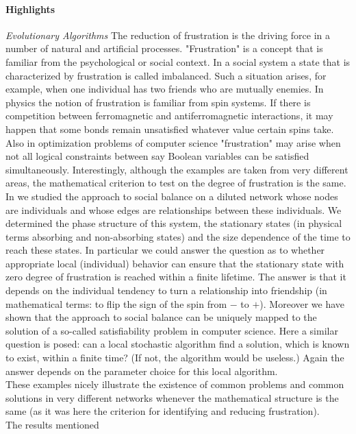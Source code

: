 \paragraph{Highlights}
{\it Evolutionary Algorithms}
The reduction of frustration is the driving force in a number of
natural and artificial processes. "Frustration" is a concept that
is familiar from the psychological or social context. In a social
system a state that is characterized by frustration is called
imbalanced. Such a situation arises, for example, when one
individual has two friends who are mutually enemies. In physics
the notion of frustration is familiar from spin systems. If there
is competition between ferromagnetic and antiferromagnetic
interactions, it may happen that some bonds remain unsatisfied
whatever value certain spins take. Also in optimization problems
of computer science "frustration" may arise when not all logical
constraints between say Boolean variables can be satisfied
simultaneously. Interestingly, although the examples are taken
from very different areas, the mathematical criterion to test on
the degree of frustration is the same. In \cite{ortmanns1} we
studied the approach to social balance on a diluted network whose
nodes are individuals and whose edges are relationships between
these individuals. We determined the phase structure of this
system, the stationary states (in physical terms absorbing and
non-absorbing states) and the size dependence of the time to reach
these states. In particular we could answer the question as to
whether appropriate local (individual) behavior can ensure that
the stationary state with zero degree of frustration is reached
within a finite lifetime. The answer is that it depends on the
individual tendency to turn a relationship into friendship (in
mathematical terms: to flip the sign of the spin from $-$ to $+$).
Moreover we have shown that the approach to social balance can be
uniquely mapped to the solution of a so-called satisfiability
problem in computer science. Here a similar question is posed: can
a local stochastic algorithm find a solution, which is known to
exist, within a finite time? (If not, the algorithm would be
useless.)
Again the answer depends on the parameter choice for this local algorithm. \\
These examples nicely illustrate the existence of common problems
and common solutions in very different networks whenever the
mathematical structure is the same (as it was here the criterion
for identifying and reducing frustration). \\The results mentioned

